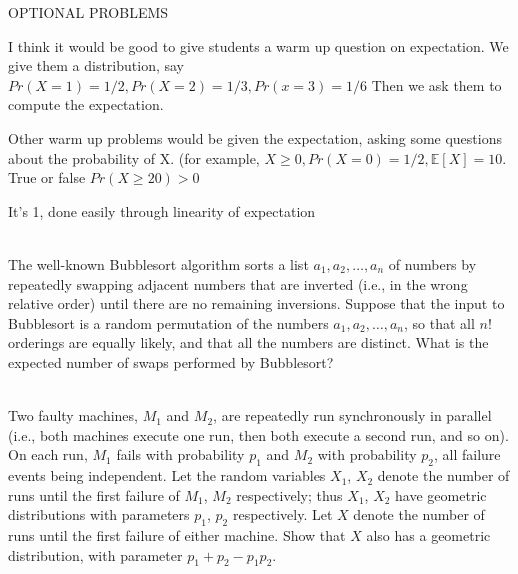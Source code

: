 \documentclass[]{article}
\begin{document}
OPTIONAL PROBLEMS

\begin{qunlist}

 
 I think it would be good to give students a warm up question on expectation. We give them a distribution, say $Pr(X = 1) = 1/2, Pr (X=2) = 1/3, Pr (x=3) = 1/6$ Then we ask them to compute the expectation.
 
 Other warm up problems would be given the expectation, asking some questions about the probability of X. (for example, $X\geq 0, Pr(X=0) = 1/2, \mathbb{E}[X] = 10.$ True or false $Pr(X \geq 20) > 0$



It's 1, done easily through linearity of expectation


 \\
The well-known Bubblesort algorithm sorts a list $a_1, a_2, \ldots, a_n$ of numbers by repeatedly swapping adjacent numbers that are inverted (i.e., in the wrong relative order) until there are no remaining inversions. Suppose that the input to Bubblesort is a random permutation of the numbers $a_1, a_2, \ldots, a_n$, so that all $n!$ orderings are equally likely, and that all the numbers are distinct. What is the expected number of swaps performed by Bubblesort?

 \\
Two faulty machines, $M_1$ and $M_2$, are repeatedly run synchronously in parallel (i.e., both machines execute one run, then both execute a second run, and so on). On each run, $M_1$ fails with probability $p_1$ and $M_2$ with probability $p_2$, all failure events being independent. Let the random variables $X_1$, $X_2$ denote the number of runs until the first failure of $M_1$, $M_2$ respectively; thus $X_1$, $X_2$ have geometric distributions with parameters $p_1$, $p_2$ respectively.
Let $X$ denote the number of runs until the first failure of either machine. Show that $X$ also has a geometric distribution, with parameter $p_1 + p_2 − p_1p_2.$

    
\end{qunlist}
\end{document}
